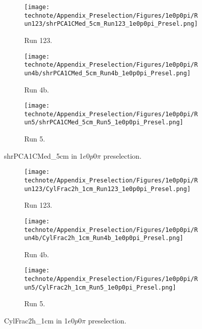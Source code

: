 \begin{figure}[H]
    \centering
    \begin{subfigure}[t]{0.32\linewidth}
        \texttt{[image: technote/Appendix\_Preselection/Figures/1e0p0pi/Run123/shrPCA1CMed\_5cm\_Run123\_1e0p0pi\_Presel.png]}
        \caption{Run 123.}
    \end{subfigure}%
    \hspace{0.2cm}%
    \begin{subfigure}[t]{0.32\linewidth}
        \texttt{[image: technote/Appendix\_Preselection/Figures/1e0p0pi/Run4b/shrPCA1CMed\_5cm\_Run4b\_1e0p0pi\_Presel.png]}
        \caption{Run 4b.}
    \end{subfigure}%
    \hspace{0.2cm}%
    \begin{subfigure}[t]{0.32\linewidth}
        \texttt{[image: technote/Appendix\_Preselection/Figures/1e0p0pi/Run5/shrPCA1CMed\_5cm\_Run5\_1e0p0pi\_Presel.png]}
        \caption{Run 5.}
    \end{subfigure}
    \caption{shrPCA1CMed\_5cm in 1$e$0$p$0$\pi$ preselection.}
\end{figure}

\begin{figure}[H]
    \centering
    \begin{subfigure}[t]{0.32\linewidth}
        \texttt{[image: technote/Appendix\_Preselection/Figures/1e0p0pi/Run123/CylFrac2h\_1cm\_Run123\_1e0p0pi\_Presel.png]}
        \caption{Run 123.}
    \end{subfigure}%
    \hspace{0.2cm}%
    \begin{subfigure}[t]{0.32\linewidth}
        \texttt{[image: technote/Appendix\_Preselection/Figures/1e0p0pi/Run4b/CylFrac2h\_1cm\_Run4b\_1e0p0pi\_Presel.png]}
        \caption{Run 4b.}
    \end{subfigure}%
    \hspace{0.2cm}%
    \begin{subfigure}[t]{0.32\linewidth}
        \texttt{[image: technote/Appendix\_Preselection/Figures/1e0p0pi/Run5/CylFrac2h\_1cm\_Run5\_1e0p0pi\_Presel.png]}
        \caption{Run 5.}
    \end{subfigure}
    \caption{CylFrac2h\_1cm in 1$e$0$p$0$\pi$ preselection.}
\end{figure}

